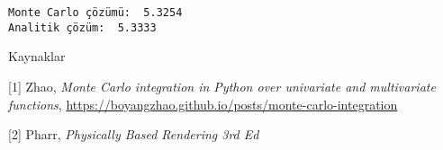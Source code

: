 \documentclass[12pt,fleqn]{article}\usepackage{../../common}
\begin{document}
\begin{verbatim}
Monte Carlo çözümü:  5.3254
Analitik çözüm:  5.3333
\end{verbatim}





Kaynaklar

[1] Zhao, {\em Monte Carlo integration in Python over univariate and multivariate functions},
    \url{https://boyangzhao.github.io/posts/monte-carlo-integration}

[2] Pharr, {\em Physically Based Rendering 3rd Ed}
    
\end{document}
